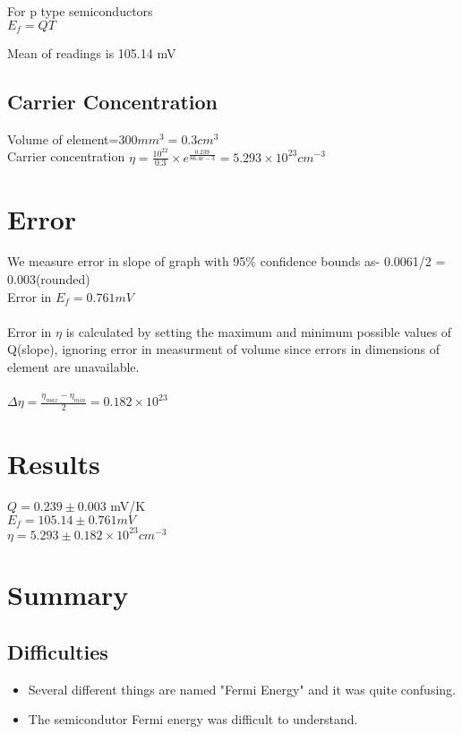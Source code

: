 \documentclass{article}
\begin{document}
For p type semiconductors
\\
$E_f = QT$

Mean of readings is 105.14 mV

\subsection{Carrier Concentration}

Volume of element=300$mm^3 = 0.3 cm^3$
\\
Carrier concentration $\eta = \frac{10^{22}}{0.3} \times e^{\frac{0.239}{86.4e-3}} = 5.293 \times 10^{23} cm^{-3}$

\section{Error}

We measure error in slope of graph with 95\% confidence bounds as- 0.0061/2 = 0.003(rounded)
\\
Error in $E_f= 0.761 mV$
\\
\\
Error in $\eta$ is calculated by setting the maximum and minimum possible values of Q(slope), ignoring error in measurment of volume since errors in dimensions of element are unavailable.
\\
\\
$\Delta \eta = \frac{\eta_{max} - \eta_{min}}{2} = 0.182 \times 10^{23} $

\section{Results}

 $Q =  0.239\pm 0.003$ mV/K
 \\
 $E_f=105.14 \pm 0.761 mV$
\\
$\eta=5.293 \pm 0.182 \times 10^{23} cm^{-3}$
\section{Summary}

\subsection{Difficulties}

\begin{itemize}
    \item Several different things are named "Fermi Energy" and it was quite confusing.
    \item The semicondutor Fermi energy was difficult to understand.
\end{itemize}
\end{document}
